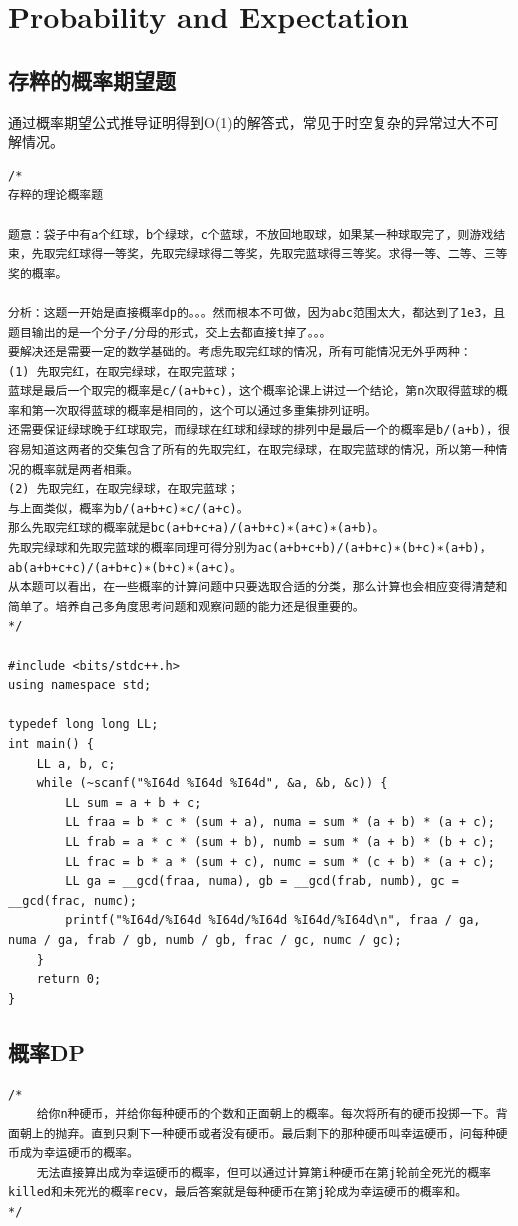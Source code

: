 \documentclass[10pt]{ctexart}
\begin{document}
{\newpage
\section{Probability and Expectation}
\subsection{存粹的概率期望题}
通过概率期望公式推导证明得到O(1)的解答式，常见于时空复杂的异常过大不可解情况。
\begin{lstlisting}
/*
存粹的理论概率题

题意：袋子中有a个红球，b个绿球，c个蓝球，不放回地取球，如果某一种球取完了，则游戏结束，先取完红球得一等奖，先取完绿球得二等奖，先取完蓝球得三等奖。求得一等、二等、三等奖的概率。

分析：这题一开始是直接概率dp的。。。然而根本不可做，因为abc范围太大，都达到了1e3，且题目输出的是一个分子/分母的形式，交上去都直接t掉了。。。
要解决还是需要一定的数学基础的。考虑先取完红球的情况，所有可能情况无外乎两种：
(1) 先取完红，在取完绿球，在取完蓝球；
蓝球是最后一个取完的概率是c/(a+b+c)，这个概率论课上讲过一个结论，第n次取得蓝球的概率和第一次取得蓝球的概率是相同的，这个可以通过多重集排列证明。
还需要保证绿球晚于红球取完，而绿球在红球和绿球的排列中是最后一个的概率是b/(a+b)，很容易知道这两者的交集包含了所有的先取完红，在取完绿球，在取完蓝球的情况，所以第一种情况的概率就是两者相乘。
(2) 先取完红，在取完绿球，在取完蓝球；
与上面类似，概率为b/(a+b+c)∗c/(a+c)。
那么先取完红球的概率就是bc(a+b+c+a)/(a+b+c)∗(a+c)∗(a+b)。
先取完绿球和先取完蓝球的概率同理可得分别为ac(a+b+c+b)/(a+b+c)∗(b+c)∗(a+b)，ab(a+b+c+c)/(a+b+c)∗(b+c)∗(a+c)。
从本题可以看出，在一些概率的计算问题中只要选取合适的分类，那么计算也会相应变得清楚和简单了。培养自己多角度思考问题和观察问题的能力还是很重要的。
*/

#include <bits/stdc++.h>
using namespace std;

typedef long long LL;
int main() {
    LL a, b, c;
    while (~scanf("%I64d %I64d %I64d", &a, &b, &c)) {
        LL sum = a + b + c;
        LL fraa = b * c * (sum + a), numa = sum * (a + b) * (a + c);
        LL frab = a * c * (sum + b), numb = sum * (a + b) * (b + c);
        LL frac = b * a * (sum + c), numc = sum * (c + b) * (a + c);
        LL ga = __gcd(fraa, numa), gb = __gcd(frab, numb), gc = __gcd(frac, numc);
        printf("%I64d/%I64d %I64d/%I64d %I64d/%I64d\n", fraa / ga, numa / ga, frab / gb, numb / gb, frac / gc, numc / gc);
    }
    return 0;
}
\end{lstlisting}

\subsection{概率DP}
\begin{lstlisting}
/*
    给你n种硬币，并给你每种硬币的个数和正面朝上的概率。每次将所有的硬币投掷一下。背面朝上的抛弃。直到只剩下一种硬币或者没有硬币。最后剩下的那种硬币叫幸运硬币，问每种硬币成为幸运硬币的概率。
    无法直接算出成为幸运硬币的概率，但可以通过计算第i种硬币在第j轮前全死光的概率killed和未死光的概率recv，最后答案就是每种硬币在第j轮成为幸运硬币的概率和。
*/


\end{lstlisting}}
\end{document}
